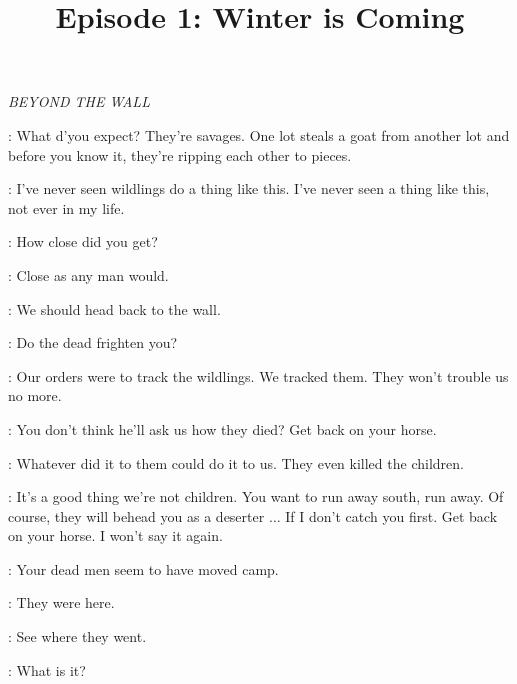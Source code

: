 

\title{Episode 1: Winter is Coming}
\author{}
\date{}
\maketitle




\scene

\textit{BEYOND THE WALL} 


\ROYCE: What d'you expect? They're savages. One lot steals a goat from another lot and before you know it, they're ripping each other to pieces. 

\WILL: I've never seen wildlings do a thing like this. I've never seen a thing like this, not ever in my life. 

\ROYCE: How close did you get? 

\WILL: Close as any man would. 

\GARED: We should head back to the wall. 

\ROYCE: Do the dead frighten you? 

\GARED: Our orders were to track the wildlings. We tracked them. They won't trouble us no more. 

\ROYCE: You don't think he'll ask us how they died? Get back on your horse. 

\WILL: Whatever did it to them could do it to us. They even killed the children. 

\ROYCE: It's a good thing we're not children. You want to run away south, run away. Of course, they will behead you as a deserter $\ldots$ If I don't catch you first. Get back on your horse. I won't say it again. 


\ROYCE: Your dead men seem to have moved camp. 

\WILL: They were here. 

\GARED: See where they went. 


\ROYCE: What is it? 

